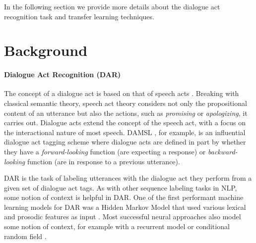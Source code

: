 \documentclass[11pt,a4paper]{article}
\begin{document}
In the following section we provide more details about the dialogue act recognition task and transfer learning techniques. 


\section{Background}

\paragraph{Dialogue Act Recognition (DAR)}
The concept of a dialogue act is based on that of speech acts \citep{austinHowThingsWords2009}.
Breaking with classical semantic theory, speech act theory considers not only the propositional content of an utterance but also the actions, such as \emph{promising} or \emph{apologizing}, it carries out.
Dialogue acts extend the concept of the speech act, with a focus on the interactional nature of most speech.
DAMSL \citep{coreCodingDialogsDAMSL1997}, for example, is an influential dialogue act tagging scheme where dialogue acts are defined in part by whether they have a \emph{forward-looking} function (are expecting a response) or \emph{backward-looking} function (are in response to a previous utterance).

DAR is the task of labeling utterances with the dialogue act they perform from a given set of dialogue act tags.
As with other sequence labeling tasks in NLP, some notion of context is helpful in DAR.
One of the first performant machine learning models for DAR was a Hidden Markov Model that used various lexical and prosodic features as input \citep{stolckeDialogueActModeling2000}.
Most successful neural approaches also model some notion of context, 
for example with a recurrent model \citep[e.g.,][]{botheContextbasedApproachDialogue2018} or conditional random field \citep[e.g.,][]{chenDialogueActRecognition2017}.
\end{document}

